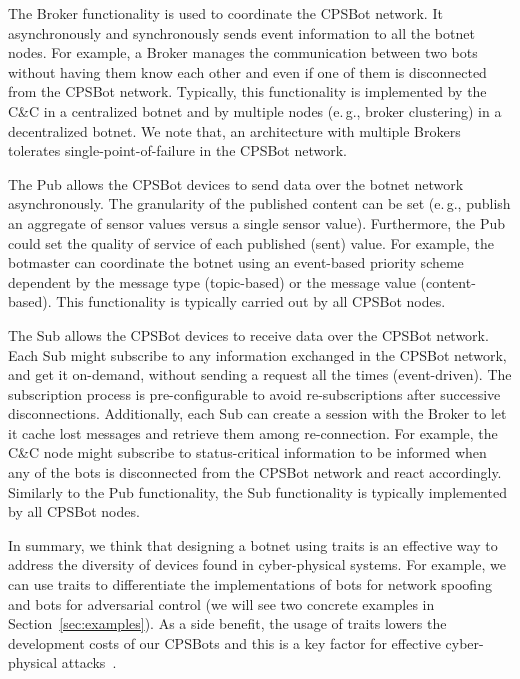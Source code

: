 \documentclass[sigconf]{acmart}
\makeatletter
\newcommand{\Paragraph}[1]{\smallskip\noindent{\bf #1.}}
\newcommand{\eg}{e.\@\,g.,\@\xspace}
\newcommand{\Botnet}{CPSBot\@\xspace}
\newcommand{\Botnets}{CPSBots\@\xspace}
\newcommand{\CC}{C\&C\@\xspace}
\makeatother
\begin{document}
\Paragraph{Broker} The Broker functionality is used to coordinate the \Botnet
network. It asynchronously and synchronously sends event information to
all the botnet nodes. For example, a Broker manages the communication between
two bots without having them know each other and even
if one of them is disconnected from the \Botnet network. Typically, this
functionality is implemented by the \CC in a centralized botnet and by multiple nodes
(\eg broker clustering) in a decentralized botnet. We note that, an architecture with
multiple Brokers tolerates single-point-of-failure in the \Botnet network.


\Paragraph{Pub} The Pub allows the \Botnet devices to send data over the
botnet network asynchronously. The granularity of the published content can be
set (\eg publish an aggregate of sensor values versus a single sensor value).
Furthermore, the Pub could set the quality of service of each published
(sent) value. For example, the botmaster can coordinate the botnet using an
event-based priority scheme dependent by the message type (topic-based) or the
message value (content-based). This functionality is typically carried out by
all \Botnet nodes.


\Paragraph{Sub} The Sub allows the \Botnet devices to receive data
over the \Botnet network. Each Sub might subscribe to any information exchanged
in the \Botnet network, and get it on-demand, without sending a request all the
times (event-driven). The subscription process is pre-configurable to avoid
re-subscriptions after successive disconnections. Additionally, each Sub can
create a session with the Broker to let it cache lost messages and retrieve
them among re-connection.
For example, the \CC node might subscribe to status-critical information to be
informed when any of the bots is disconnected from the \Botnet network and react
accordingly. Similarly to the Pub functionality, the Sub functionality is
typically implemented by all \Botnet nodes.

In summary, we think that designing a botnet using traits is an effective
way to address the diversity of devices found in cyber-physical systems. For
example, we can use traits to differentiate the implementations of bots for
network spoofing and bots for adversarial control (we will see two concrete
examples in Section~\ref{sec:examples}). As a side benefit, the usage of
traits lowers the development costs of our \Botnets and this is a key factor
for effective cyber-physical attacks~\cite{gollmann2015cyber}.

\end{document}
